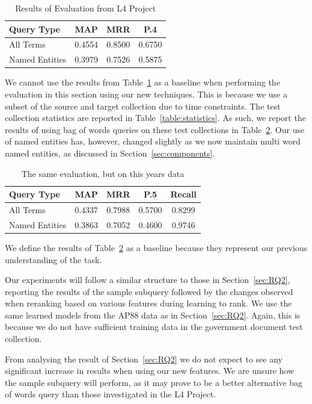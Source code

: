 \documentclass{mpaper}
\begin{document}
\begin{table}[h]
\centering
\begin{tabular}{|l|ccc|} \hline
Query Type 		& MAP 		& MRR 		& P.4 		\\ \hline
All Terms 		& 0.4554 	& 0.8500  	& 0.6750   	\\
Named Entities 	& 0.3979 	& 0.7526 	& 0.5875    \\ \hline
\end{tabular}
\caption{Results of Evaluation from L4 Project}
\label{table:lastyears}
\end{table}

We cannot use the results from Table~\ref{table:lastyears} as a baseline when performing the evaluation in this section using our new techniques. 
This is because we use a subset of the source and target collection due to time constraints. The test collection statistics are reported in Table~\ref{table:statistics}.
As such, we report the results of using bag of words queries on these test collections in Table~\ref{table:rq3baseline}. Our use of named entities has, however, changed slightly as we now maintain multi word named entities, as discussed in Section~\ref{sec:components}.

\begin{table}[h]
\centering
\begin{tabular}{|l|cccc|} \hline
Query Type 		& MAP 		& MRR 		& P.5 		& Recall	\\ \hline
All Terms 		& 0.4337 	& 0.7988  	& 0.5700	& 0.8299   	\\
Named Entities 	& 0.3863 	& 0.7052 	& 0.4600    & 0.9746	\\ \hline
\end{tabular}
\caption{The same evaluation, but on this years data}
\label{table:rq3baseline}
\end{table}

We define the results of Table~\ref{table:rq3baseline} as a baseline because they represent our previous understanding of the task.

Our experiments will follow a similar structure to those in Section~\ref{sec:RQ2}, reporting the results of the sample subquery followed by the changes observed when reranking based on various features during learning to rank. We use the same learned models from the AP88 data as in Section~\ref{sec:RQ2}. Again, this is because we do not have sufficient training data in the government document test collection.

From analysing the result of Section~\ref{sec:RQ2} we do not expect to see any significant increase in results when using our new features.
We are unsure how the sample subquery will perform, as it may prove to be a better alternative bag of words query than those investigated in the L4 Project.
\end{document}
